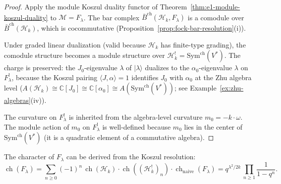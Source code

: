 \begin{proof}
Apply the module Koszul duality functor of
Theorem~\ref{thm:e1-module-koszul-duality} to
$\mathcal{M} = F_\lambda$.  The bar complex
$\bar{B}^{\mathrm{ch}}(\mathcal{H}_k, F_\lambda)$ is a comodule
over $\bar{B}^{\mathrm{ch}}(\mathcal{H}_k)$, which is
cocommutative (Proposition~\ref{prop:fock-bar-resolution}(i)).

Under graded linear dualization (valid because $\mathcal{H}_k$
has finite-type grading), the comodule structure becomes a module
structure over $\mathcal{H}_k^! = \mathrm{Sym}^{\mathrm{ch}}(V^*)$.
The charge is preserved: the $J_0$-eigenvalue $\lambda$ of
$|\lambda\rangle$ dualizes to the $\alpha_0$-eigenvalue $\lambda$ on
$F_\lambda^!$, because the Koszul pairing $\langle J, \alpha \rangle = 1$
identifies $J_0$ with $\alpha_0$ at the Zhu algebra level
($A(\mathcal{H}_k) \cong \mathbb{C}[J_0]
\cong \mathbb{C}[\alpha_0] \cong
A(\mathrm{Sym}^{\mathrm{ch}}(V^*))$; see
Example~\ref{ex:zhu-algebras}(iv)).

The curvature on $F_\lambda^!$ is inherited from the algebra-level
curvature $m_0 = -k \cdot \omega$.  The module action of $m_0$
on $F_\lambda^!$ is well-defined because $m_0$ lies in the center of
$\mathrm{Sym}^{\mathrm{ch}}(V^*)$ (it is a quadratic element of a
commutative algebra).
\end{proof}

\begin{corollary}
\label{cor:fock-character-koszul}
The character of $F_\lambda$ can be derived from the Koszul resolution:
\begin{equation}
\operatorname{ch}(F_\lambda)
= \sum_{n \geq 0} (-1)^n\,
  \operatorname{ch}(\mathcal{H}_k) \cdot
  \operatorname{ch}((\mathcal{H}_k^!)_n) \cdot
  \operatorname{ch}_{\mathrm{naive}}(F_\lambda)
= q^{\lambda^2/2k}\,\prod_{n \geq 1}\frac{1}{1-q^n}.
\end{equation}
\end{corollary}

